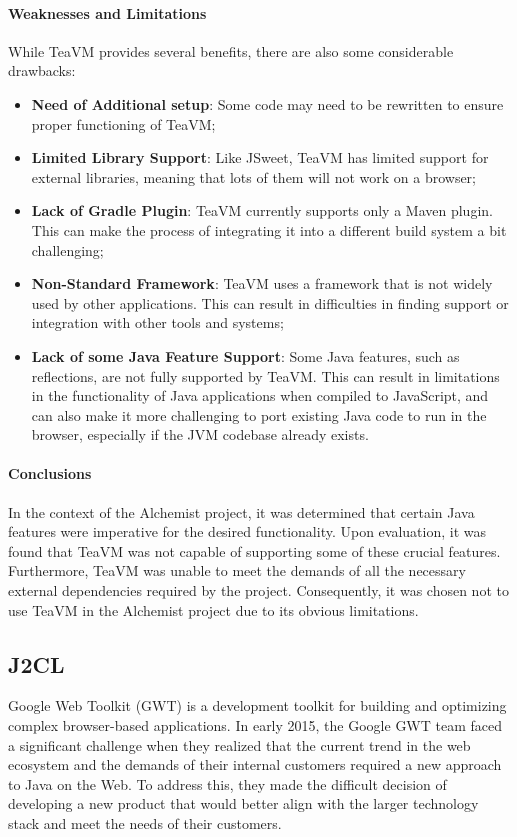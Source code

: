 \paragraph{Weaknesses and Limitations} While TeaVM provides several benefits, there are also some considerable drawbacks:
\begin{itemize}
	\item \textbf{Need of Additional setup}: Some code may need to be rewritten to ensure proper functioning of TeaVM;
	\item \textbf{Limited Library Support}: Like JSweet, TeaVM has limited support for external libraries, meaning that lots of them will not work on a browser;
	\item\textbf{Lack of Gradle Plugin}: TeaVM currently supports only a Maven plugin. This can make the process of integrating it into a different build system a bit challenging;
	\item \textbf{Non-Standard Framework}: TeaVM uses a framework that is not widely used by other applications. This can result in difficulties in finding support or integration with other tools and systems;
	\item \textbf{Lack of some Java Feature Support}: Some Java features, such as reflections, are not fully supported by TeaVM. This can result in limitations in the functionality of Java applications when compiled to JavaScript, and can also make it more challenging to port existing Java code to run in the browser, especially if the JVM codebase already exists.
\end{itemize}
\paragraph{Conclusions} In the context of the Alchemist project, it was determined that certain Java features were imperative for the desired functionality. Upon evaluation, it was found that TeaVM was not capable of supporting some of these crucial features. Furthermore, TeaVM was unable to meet the demands of all the necessary external dependencies required by the project. Consequently, it was chosen not to use TeaVM in the Alchemist project due to its obvious limitations.
\subsection{J2CL}
\label{ssec:j2cl}
Google Web Toolkit (GWT) is a development toolkit for building and optimizing complex browser-based applications. In early 2015, the Google GWT team faced a significant challenge when they realized that the current trend in the web ecosystem and the demands of their internal customers required a new approach to Java on the Web. To address this, they made the difficult decision of developing a new product that would better align with the larger technology stack and meet the needs of their customers.\newline

